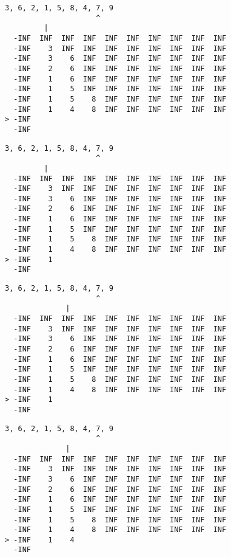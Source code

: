{ \begin{verbatim}
3, 6, 2, 1, 5, 8, 4, 7, 9
                     ^
         |
  -INF  INF  INF  INF  INF  INF  INF  INF  INF  INF
  -INF    3  INF  INF  INF  INF  INF  INF  INF  INF
  -INF    3    6  INF  INF  INF  INF  INF  INF  INF
  -INF    2    6  INF  INF  INF  INF  INF  INF  INF
  -INF    1    6  INF  INF  INF  INF  INF  INF  INF
  -INF    1    5  INF  INF  INF  INF  INF  INF  INF
  -INF    1    5    8  INF  INF  INF  INF  INF  INF
  -INF    1    4    8  INF  INF  INF  INF  INF  INF
> -INF                                             
  -INF                                             
\end{verbatim} }

{ \begin{verbatim}
3, 6, 2, 1, 5, 8, 4, 7, 9
                     ^
         |
  -INF  INF  INF  INF  INF  INF  INF  INF  INF  INF
  -INF    3  INF  INF  INF  INF  INF  INF  INF  INF
  -INF    3    6  INF  INF  INF  INF  INF  INF  INF
  -INF    2    6  INF  INF  INF  INF  INF  INF  INF
  -INF    1    6  INF  INF  INF  INF  INF  INF  INF
  -INF    1    5  INF  INF  INF  INF  INF  INF  INF
  -INF    1    5    8  INF  INF  INF  INF  INF  INF
  -INF    1    4    8  INF  INF  INF  INF  INF  INF
> -INF    1                                        
  -INF                                             
\end{verbatim} }

{ \begin{verbatim}
3, 6, 2, 1, 5, 8, 4, 7, 9
                     ^
              |
  -INF  INF  INF  INF  INF  INF  INF  INF  INF  INF
  -INF    3  INF  INF  INF  INF  INF  INF  INF  INF
  -INF    3    6  INF  INF  INF  INF  INF  INF  INF
  -INF    2    6  INF  INF  INF  INF  INF  INF  INF
  -INF    1    6  INF  INF  INF  INF  INF  INF  INF
  -INF    1    5  INF  INF  INF  INF  INF  INF  INF
  -INF    1    5    8  INF  INF  INF  INF  INF  INF
  -INF    1    4    8  INF  INF  INF  INF  INF  INF
> -INF    1                                        
  -INF                                             
\end{verbatim} }

{ \begin{verbatim}
3, 6, 2, 1, 5, 8, 4, 7, 9
                     ^
              |
  -INF  INF  INF  INF  INF  INF  INF  INF  INF  INF
  -INF    3  INF  INF  INF  INF  INF  INF  INF  INF
  -INF    3    6  INF  INF  INF  INF  INF  INF  INF
  -INF    2    6  INF  INF  INF  INF  INF  INF  INF
  -INF    1    6  INF  INF  INF  INF  INF  INF  INF
  -INF    1    5  INF  INF  INF  INF  INF  INF  INF
  -INF    1    5    8  INF  INF  INF  INF  INF  INF
  -INF    1    4    8  INF  INF  INF  INF  INF  INF
> -INF    1    4                                   
  -INF                                             
\end{verbatim} }

